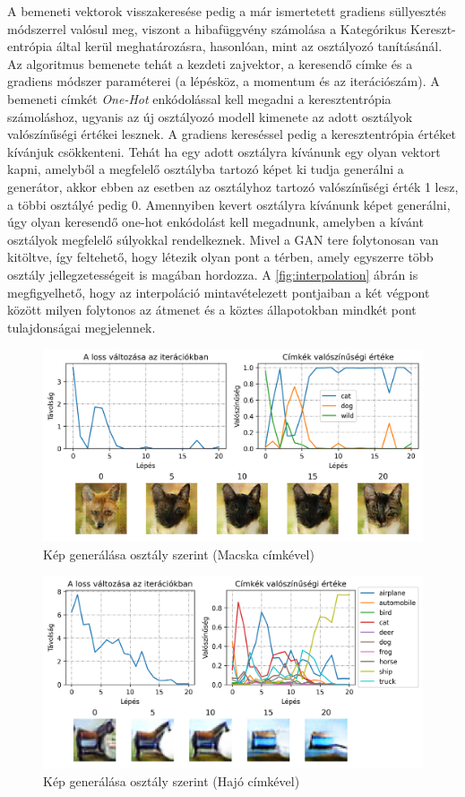 A bemeneti vektorok visszakeresése pedig a már ismertetett gradiens süllyesztés módszerrel valósul meg, viszont a hibafüggvény számolása a Kategórikus Kereszt-entrópia által kerül meghatározásra, hasonlóan, mint az osztályozó tanításánál. Az algoritmus bemenete tehát a kezdeti zajvektor, a keresendő címke és a gradiens módszer paraméterei (a lépésköz, a momentum és az iterációszám).
A bemeneti címkét \textit{One-Hot} enkódolással kell megadni a keresztentrópia számoláshoz, ugyanis az új osztályozó modell kimenete az adott osztályok valószínűségi értékei lesznek. A gradiens kereséssel pedig a keresztentrópia értéket kívánjuk csökkenteni. Tehát ha egy adott osztályra kívánunk egy olyan vektort kapni, amelyből a megfelelő osztályba tartozó képet ki tudja generálni a generátor, akkor ebben az esetben az osztályhoz tartozó valószínűségi érték 1 lesz, a többi osztályé pedig 0.
Amennyiben kevert osztályra kívánunk képet generálni, úgy olyan keresendő one-hot enkódolást kell megadnunk, amelyben a kívánt osztályok megfelelő súlyokkal rendelkeznek. Mivel a GAN tere folytonosan van kitöltve, így feltehető, hogy létezik olyan pont a térben, amely egyszerre több osztály jellegzetességeit is magában hordozza. A \ref{fig:interpolation} ábrán is megfigyelhető, hogy az interpoláció mintavételezett pontjaiban a két végpont között milyen folytonos az átmenet és a köztes állapotokban mindkét pont tulajdonságai megjelennek.


\begin{figure}[h]
	\centering
	\includegraphics[width=15cm]{images/searching-cat.png}
	\caption{Kép generálása osztály szerint (Macska címkével)}
	\label{fig:searching}
\end{figure}

\begin{figure}[h]
	\centering
	\includegraphics[width=15cm]{images/searching-cifar_ship.png}
	\caption{Kép generálása osztály szerint (Hajó címkével)}
	\label{fig:searching_ship}
\end{figure}
